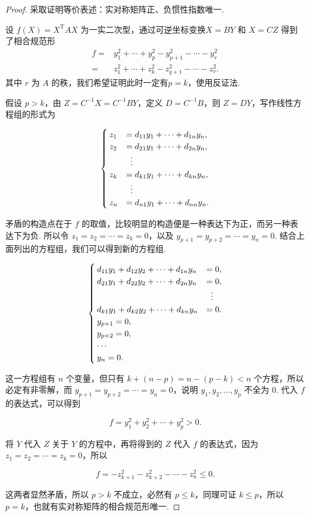\begin{proof}
    采取证明等价表述：实对称矩阵正、负惯性指数唯一.

    设 $f(X) = X^\mathrm{T}AX$ 为一实二次型，通过可逆坐标变换$X = BY$ 和 $X = CZ$ 得到了相合规范形
    \begin{align*}
        f ={} & y_1^2 + \cdots + y_p^2 - y_{p+1}^2 - \cdots - y_r^2 \\
          ={} & z_1^2 + \cdots + z_k^2 - z_{q+1}^2 - \cdots - z_r^2.
    \end{align*}
    其中 $r$ 为 $A$ 的秩，我们希望证明此时一定有$p = k$，使用反证法.

    假设 $p > k$，由 $Z = C^{-1}X = C^{-1}BY$，定义 $D = C^{-1}B$，则 $Z = DY$，写作线性方程组的形式为

    \[
        \begin{cases}
            z_1 & = d_{11}y_1 + \cdots + d_{1n}y_n, \\
            z_2 & = d_{21}y_1 + \cdots + d_{2n}y_n, \\
            & \vdotswithin{=} \\
            z_k & = d_{k1}y_1 + \cdots + d_{kn}y_n, \\
            & \vdotswithin{=} \\
            z_{n} & = d_{n1}y_1 + \cdots + d_{nn}y_n.
        \end{cases}
    \]

    矛盾的构造点在于 $f$ 的取值，比较明显的构造便是一种表达下为正，而另一种表达下为负. 所以令 $z_1 = z_2 = \cdots = z_k = 0$，以及 $y_{p + 1} = y_{p + 2} = \cdots = y_n = 0$. 结合上面列出的方程组，我们可以得到新的方程组.

    \[
        \begin{cases}
            d_{11}y_1 + d_{12}y_2 + \cdots + d_{1n}y_n & = 0, \\
            d_{21}y_1 + d_{22}y_2 + \cdots + d_{2n}y_n & = 0, \\
            & \vdotswithin{=} \\
            d_{k1}y_1 + d_{k2}y_2 + \cdots + d_{kn}y_n & = 0. \\
            y_{p + 1} = 0, \\
            y_{p + 2} = 0, \\
            \cdots \\
            y_n = 0.
        \end{cases}
    \]

    这一方程组有 $n$ 个变量，但只有 $k + (n - p) = n - (p - k) < n$ 个方程，所以必定有非零解，而 $y_{p + 1} = y_{p + 2} = \cdots = y_n = 0$，说明 $y_1, y_2, \ldots, y_p$ 不全为 $0$. 代入 $f$ 的表达式，可以得到

    \[
        f = y_1^2 + y_2^2 + \cdots + y_p^2 > 0.
    \]

    将 $Y$ 代入 $Z$ 关于 $Y$ 的方程中，再将得到的 $Z$ 代入 $f$ 的表达式，因为 $z_1 = z_2 = \cdots = z_k = 0$，所以

    \[
        f = -z_{k + 1}^2 - z_{k + 2}^2 - \cdots - z_n^2 \leqslant 0.
    \]

    这两者显然矛盾，所以 $p > k$ 不成立，必然有 $p \leqslant k$，同理可证 $k \leqslant p$，所以 $p = k$，也就有实对称矩阵的相合规范形唯一.
\end{proof}

